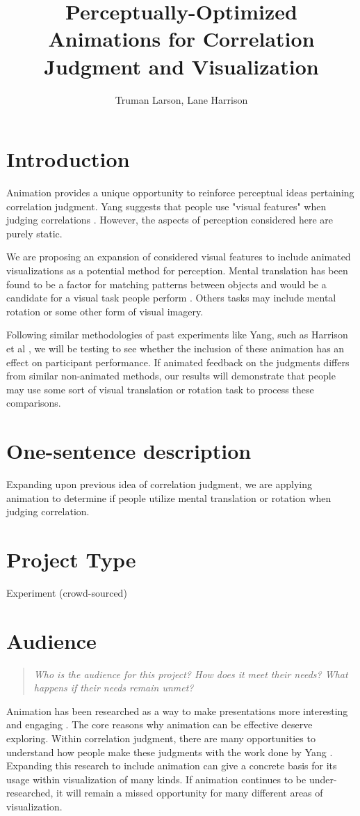 \documentclass{proc}
\begin{document}
	
	\title{Perceptually-Optimized Animations for Correlation Judgment and Visualization}

	
	\author{Truman Larson, Lane Harrison}
	
	\maketitle
	
	\section{Introduction}
		Animation provides a unique opportunity to reinforce perceptual ideas pertaining correlation judgment. Yang suggests that people use "visual features" when judging correlations \cite{Yang2019}. However, the aspects of perception considered here are purely static. 
		
		We are proposing an expansion of considered visual features to include animated visualizations as a potential method for perception. Mental translation has been found to be a factor for matching patterns between objects and would be a candidate for a visual task people perform \cite{larsen1998effects}. Others tasks may include mental rotation or some other form of visual imagery. 
		
		Following similar methodologies of past experiments like Yang, such as Harrison et al \cite{Harrison2014}, we will be testing to see whether the inclusion of these animation has an effect on participant performance. If animated feedback on the judgments differs from similar non-animated methods, our results will demonstrate that people may use some sort of visual translation or rotation task to process these comparisons.
	\section{One-sentence description}
		Expanding upon previous idea of correlation judgment, we are applying animation to determine if people utilize mental translation or rotation when judging correlation. 
	\section{Project Type}
		Experiment (crowd-sourced)
	\section{Audience} 
	\begin{quote}
		\textit{Who is the audience for this project? 
			How does it meet their needs? 
			What happens if their needs remain unmet?}
	\end{quote}
		Animation has been researched as a way to make presentations more interesting and engaging \cite{Robertson2008}. The core reasons why animation can be effective deserve exploring. Within correlation judgment, there are many opportunities to understand how people make these judgments with the work done by Yang \cite{Yang2019}. Expanding this research to include animation can give a concrete basis for its usage within visualization of many kinds. 
		If animation continues to be under-researched, it will remain a missed opportunity for many different areas of visualization.  
\end{document}
